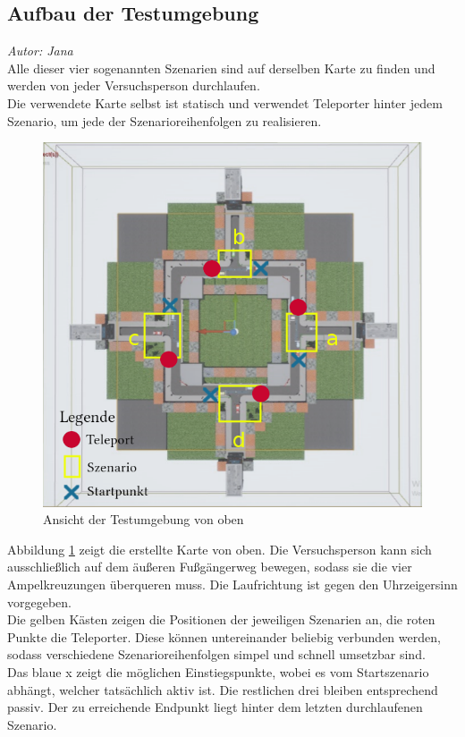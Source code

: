 \documentclass{Bericht}
\begin{document}
\subsection{Aufbau der Testumgebung}
\textit{Autor: Jana}\\
Alle dieser vier sogenannten Szenarien sind auf derselben Karte zu finden und werden von jeder Versuchsperson durchlaufen.\\
 Die verwendete Karte selbst ist statisch und verwendet Teleporter hinter jedem Szenario, um jede der Szenarioreihenfolgen zu realisieren.
 
\begin{figure}[H]
	\centering
	\includegraphics[scale=0.8]{../Bilder/mapLegende.png}
	\caption{Ansicht der Testumgebung von oben}
	\label{img:map}
\end{figure}

Abbildung \ref{img:map} zeigt die erstellte Karte von oben. 
Die Versuchsperson kann sich ausschließlich auf dem äußeren Fußgängerweg bewegen, sodass sie die vier Ampelkreuzungen überqueren muss. Die Laufrichtung ist gegen den Uhrzeigersinn vorgegeben.\\
Die gelben Kästen zeigen die Positionen der jeweiligen Szenarien an, die roten Punkte die Teleporter. Diese können untereinander beliebig verbunden werden, sodass verschiedene Szenarioreihenfolgen simpel und schnell umsetzbar sind.\\
Das blaue x zeigt die möglichen Einstiegspunkte, wobei es vom Startszenario abhängt, welcher tatsächlich aktiv ist. Die restlichen drei bleiben entsprechend passiv. Der zu erreichende Endpunkt liegt hinter dem letzten durchlaufenen Szenario. 
\end{document}
